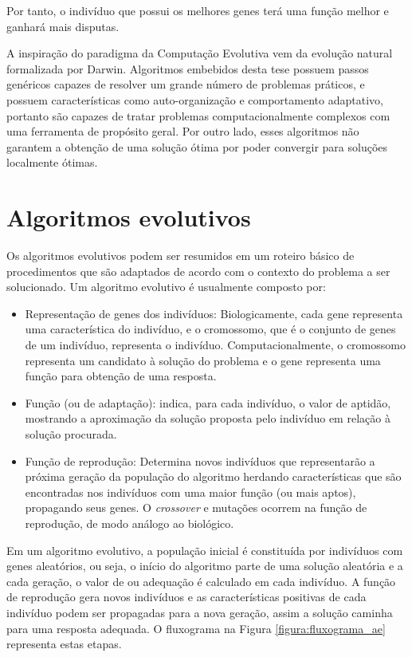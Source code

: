Por tanto, o indivíduo que possui os melhores genes terá uma função \fitness melhor e ganhará mais disputas.

A inspiração do paradigma da Computação Evolutiva vem da evolução natural formalizada por Darwin\cite{Ridley1996}.
Algoritmos embebidos desta tese possuem passos genéricos capazes de resolver um grande número de problemas práticos, e possuem características como auto-organização e comportamento adaptativo\cite{Goldberg1988},
portanto são capazes de tratar problemas computacionalmente complexos com uma ferramenta de propósito geral. Por outro lado, esses algoritmos não garantem a obtenção de uma solução ótima\cite{Zuben2000} por poder convergir para soluções localmente ótimas.

\section{Algoritmos evolutivos}
Os algoritmos evolutivos podem ser resumidos em um roteiro básico de procedimentos\cite{Todd1997}
que são adaptados de acordo com o contexto do problema a ser solucionado\cite{Werger1999}\cite{Mitchell1995}.
Um algoritmo evolutivo é usualmente composto por:

\newcommand{\crossover}{\textit{crossover}\xspace}

\begin{itemize}
    \item Representação de genes dos indivíduos: Biologicamente, cada gene representa uma característica do indivíduo, e o cromossomo, que é o conjunto de genes de um indivíduo, representa o indivíduo. Computacionalmente, o cromossomo representa um candidato à solução do problema e o gene representa uma função para obtenção de uma resposta.
    \item Função \fitness (ou de adaptação): indica, para cada indivíduo, o valor de aptidão, mostrando a aproximação da solução proposta pelo indivíduo em relação à solução procurada.
    \item Função de reprodução: Determina novos indivíduos que representarão a próxima geração da população do algoritmo herdando características que são encontradas nos indivíduos com uma maior função \fitness (ou mais aptos), propagando seus genes. O \crossover e mutações ocorrem na função de reprodução, de modo análogo ao biológico.
\end{itemize}

Em um algoritmo evolutivo, a população inicial é constituída por indivíduos com genes aleatórios, ou seja, o início do algoritmo parte de uma solução aleatória e a cada geração, o valor de \fitness ou adequação é calculado em cada indivíduo. A função de reprodução gera novos indivíduos e as características positivas de cada indivíduo podem ser propagadas para a nova geração, assim a solução caminha para uma resposta adequada. O fluxograma na Figura \ref{figura:fluxograma_ae} representa estas etapas.

